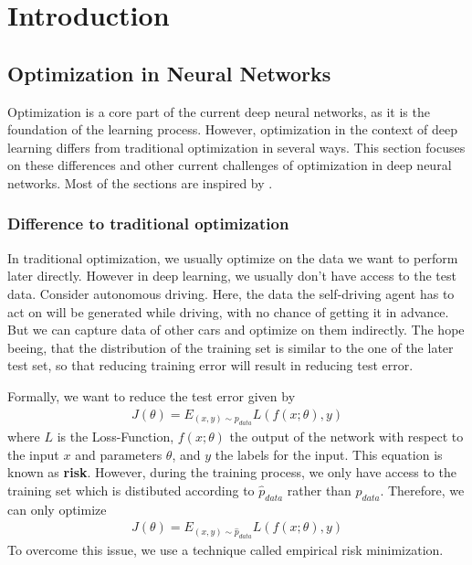\chapter{Introduction}
\section{Optimization in Neural Networks}
Optimization is a core part of the current deep neural networks, as it is the
foundation of the learning process. However, optimization in the context of deep
learning differs from traditional optimization in several ways. This section
focuses on these differences and other current challenges of optimization in
deep neural networks. Most of the sections are inspired by
\cite{Goodfellow-et-al-2016}.

\subsection{Difference to traditional optimization}\label{sub:1}
In traditional optimization, we usually optimize on the data we want to perform
later directly. However in deep learning, we usually don't have access to the
test data. Consider autonomous driving. Here, the data the self-driving agent
has to act on will be generated while driving, with no chance of getting it in
advance. But we can capture data of other cars and optimize on them indirectly.
The hope beeing, that the distribution of the training set is similar to the one
of the later test set, so that reducing training error will result in reducing
test error.

Formally, we want to reduce the test error given by
\begin{align}\label{eq:1}
    J(\theta) = E_{(x,y)\sim p_{data}} L(f(x;\theta), y)
\end{align}
where $L$ is the Loss-Function, $f(x;\theta)$ the output of the network with
respect to the input $x$ and parameters $\theta$, and $y$ the labels for the
input. This equation is known as \textbf{risk}. However, during the training
process, we only have access to the training set which is distibuted according 
to $\hat{p}_{data}$ rather than $p_{data}$. Therefore, we can only optimize
\begin{align}
    J(\theta) = E_{(x,y)\sim \hat{p}_{data}} L(f(x;\theta), y)
\end{align}
To overcome this issue, we use a technique called empirical risk minimization.

